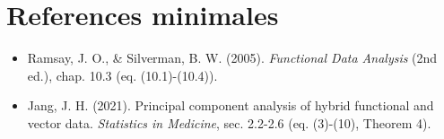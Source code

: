 \documentclass[11pt,a4paper]{article}
\begin{document}
\section*{References minimales}
\begin{itemize}[leftmargin=1.5em]
  \item Ramsay, J. O., \& Silverman, B. W. (2005). \emph{Functional Data Analysis} (2nd ed.), chap. 10.3 (eq. (10.1)-(10.4)).
  \item Jang, J. H. (2021). Principal component analysis of hybrid functional and vector data. \emph{Statistics in Medicine}, sec. 2.2-2.6 (eq. (3)-(10), Theorem 4).
\end{itemize}
\end{document}
